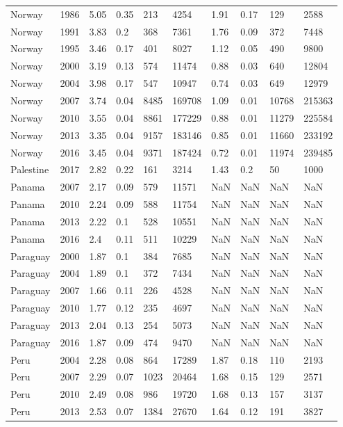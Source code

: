 \begin{tabular}{llllllllll}
Norway & 1986 & 5.05 & 0.35 & 213 & 4254 & 1.91 & 0.17 & 129 & 2588 \\ 
Norway & 1991 & 3.83 & 0.2 & 368 & 7361 & 1.76 & 0.09 & 372 & 7448 \\ 
Norway & 1995 & 3.46 & 0.17 & 401 & 8027 & 1.12 & 0.05 & 490 & 9800 \\ 
Norway & 2000 & 3.19 & 0.13 & 574 & 11474 & 0.88 & 0.03 & 640 & 12804 \\ 
Norway & 2004 & 3.98 & 0.17 & 547 & 10947 & 0.74 & 0.03 & 649 & 12979 \\ 
Norway & 2007 & 3.74 & 0.04 & 8485 & 169708 & 1.09 & 0.01 & 10768 & 215363 \\ 
Norway & 2010 & 3.55 & 0.04 & 8861 & 177229 & 0.88 & 0.01 & 11279 & 225584 \\ 
Norway & 2013 & 3.35 & 0.04 & 9157 & 183146 & 0.85 & 0.01 & 11660 & 233192 \\ 
Norway & 2016 & 3.45 & 0.04 & 9371 & 187424 & 0.72 & 0.01 & 11974 & 239485 \\ 
Palestine & 2017 & 2.82 & 0.22 & 161 & 3214 & 1.43 & 0.2 & 50 & 1000 \\ 
Panama & 2007 & 2.17 & 0.09 & 579 & 11571 & NaN & NaN & NaN & NaN \\ 
Panama & 2010 & 2.24 & 0.09 & 588 & 11754 & NaN & NaN & NaN & NaN \\ 
Panama & 2013 & 2.22 & 0.1 & 528 & 10551 & NaN & NaN & NaN & NaN \\ 
Panama & 2016 & 2.4 & 0.11 & 511 & 10229 & NaN & NaN & NaN & NaN \\ 
Paraguay & 2000 & 1.87 & 0.1 & 384 & 7685 & NaN & NaN & NaN & NaN \\ 
Paraguay & 2004 & 1.89 & 0.1 & 372 & 7434 & NaN & NaN & NaN & NaN \\ 
Paraguay & 2007 & 1.66 & 0.11 & 226 & 4528 & NaN & NaN & NaN & NaN \\ 
Paraguay & 2010 & 1.77 & 0.12 & 235 & 4697 & NaN & NaN & NaN & NaN \\ 
Paraguay & 2013 & 2.04 & 0.13 & 254 & 5073 & NaN & NaN & NaN & NaN \\ 
Paraguay & 2016 & 1.87 & 0.09 & 474 & 9470 & NaN & NaN & NaN & NaN \\ 
Peru & 2004 & 2.28 & 0.08 & 864 & 17289 & 1.87 & 0.18 & 110 & 2193 \\ 
Peru & 2007 & 2.29 & 0.07 & 1023 & 20464 & 1.68 & 0.15 & 129 & 2571 \\ 
Peru & 2010 & 2.49 & 0.08 & 986 & 19720 & 1.68 & 0.13 & 157 & 3137 \\ 
Peru & 2013 & 2.53 & 0.07 & 1384 & 27670 & 1.64 & 0.12 & 191 & 3827 \\ 

\end{tabular}
